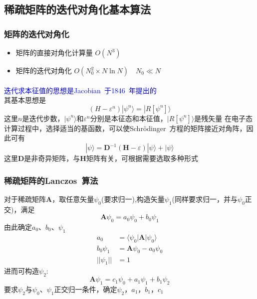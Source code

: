\documentclass[cjk,slidestop,compress,mathserif,blue]{beamer}
\newcommand{\upcite}[1]{\hspace{0ex}\textsuperscript{\cite{#1}}} %
\begin{document}
\subsection{稀疏矩阵的迭代对角化基本算法}
\frame
{
	\frametitle{矩阵的迭代对角化}
	\begin{itemize}
		\item 矩阵的直接对角化计算量 $O(N^3)$
		\item 矩阵的迭代对角化 $O(N_0^2\times N\ln N)\quad N_0\ll N$
	\end{itemize}
	\textcolor{blue}{迭代求本征值的思想是\textrm{Jacobian~}于\textrm{1846~}年提出的}\upcite{Crelle30-51_1846}\\
	其基本思想是
	\begin{displaymath}
		(H-\varepsilon^n)|\psi^n\rangle=|R[\psi^n]\rangle
	\end{displaymath}
	这里$n$是迭代步数，$|\psi^n\rangle$和$\varepsilon^n$分别是本征态和本征值，$|R[\psi^n]\rangle$是残矢量
	\vskip 10pt
	在电子态计算过程中，选择适当的基函数，可以使\textrm{Schr\"odinger~}方程的矩阵接近对角阵，因此可有
	\begin{displaymath}
		|\psi\rangle=\mathbf{D}^{-1}(\mathbf{H}-\varepsilon)|\psi\rangle+|\psi\rangle
	\end{displaymath}
	这里$\mathbf{D}$是非奇异矩阵，与$\mathbf{H}$矩阵有关，可根据需要选取多种形式
}

\frame
{
	\frametitle{稀疏矩阵的\textrm{Lanczos~}算法}
	对于稀疏矩阵$\mathbf{A}$，取任意矢量$\psi_0$(要求归一),构造矢量$\psi_1$(同样要求归一，并与$\psi_0$正交)，满足
	\begin{displaymath}
		\mathbf{A}\psi_0=a_0\psi_0+b_0\psi_1
	\end{displaymath}
	由此确定$a_0$、$b_0$、$\psi_1$
	\begin{displaymath}
		\begin{aligned}
			a_0&=\langle\psi_0|\mathbf{A}|\psi_0\rangle\\
			b_0\psi_1&=\mathbf{A}\psi_0-a_0\psi_0\\
			||\psi_1||&=1
		\end{aligned}
	\end{displaymath}
	进而可构造$\psi_2$:
	\begin{displaymath}
		\mathbf{A}\psi_1=c_1\psi_0+a_1\psi_1+b_1\psi_2
	\end{displaymath}
	要求$\psi_2$与$\psi_0$、$\psi_1$正交归一条件，确定$\psi_2$，$a_1$，$b_1$，$c_1$
}
\end{document}
